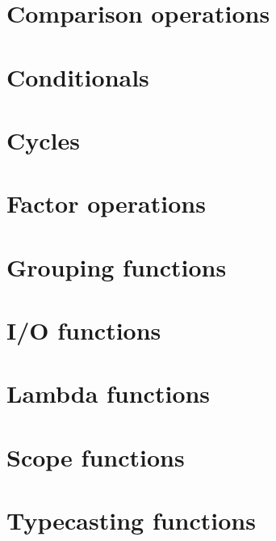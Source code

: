 \documentclass[11pt]{scrreprt}
\begin{document}
\section{Comparison operations}

\section{Conditionals}

\section{Cycles}

\section{Factor operations}

\section{Grouping functions}

\section{I/O functions}

\section{Lambda functions}

\section{Scope functions}

\section{Typecasting functions}
\end{document}
